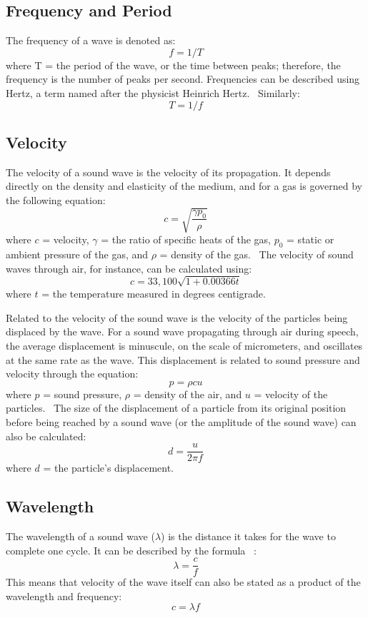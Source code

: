 \documentclass[12pt]{article}
\begin{document}
\subsection{Frequency and Period}

The frequency of a wave is denoted as: $$f = 1/T$$
where T = the period of the wave, or the time between peaks; therefore, the frequency is the number of peaks per second. Frequencies can be described using Hertz, a term named after the physicist Heinrich Hertz.~\cite{pierce,olson} Similarly: $$T = 1/f$$

\subsection{Velocity}

The velocity of a sound wave is the velocity of its propagation. It depends directly on the density and elasticity of the medium, and for a gas is governed by the following equation: $$ c = \sqrt{\frac{\gamma p_{0}}{\rho}}$$
where $c$ = velocity, $\gamma$ = the ratio of specific heats of the gas, $p_{0}$ = static or ambient pressure of the gas, and $\rho$ = density of the gas.~\cite{olson,backus}
The velocity of sound waves through air, for instance, can be calculated using: $$c = 33,100\sqrt{1 + 0.00366t}$$
where $t$ = the temperature measured in degrees centigrade.~\cite{olson}

Related to the velocity of the sound wave is the velocity of the particles being displaced by the wave. For a sound wave propagating through air during speech, the average displacement is minuscule, on the scale of micrometers, and oscillates at the same rate as the wave. This displacement is related to sound pressure and velocity through the equation: $$p = \rho cu$$
where $p$ = sound pressure, $\rho$ = density of the air, and $u$ = velocity of the particles.~\cite{olson} The size of the displacement of a particle from its original position before being reached by a sound wave (or the amplitude of the sound wave) can also be calculated: $$d = \frac{u}{2\pi f}$$
where $d$ = the particle's displacement.

\subsection{Wavelength}

The wavelength of a sound wave ($\lambda$) is the distance it takes for the wave to complete one cycle. It can be described by the formula ~\cite{olson}: $$\lambda = \frac{c}{f}$$
This means that velocity of the wave itself can also be stated as a product of the wavelength and frequency: $$c = \lambda f$$
\end{document}
